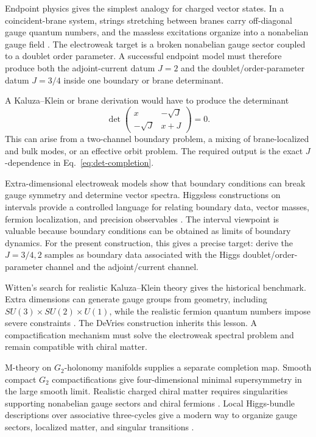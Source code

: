 Endpoint physics gives the simplest analogy for charged vector states.  In a coincident-brane system, strings stretching between branes carry off-diagonal gauge quantum numbers, and the massless excitations organize into a nonabelian gauge field \cite{TongString}.  The electroweak target is a broken nonabelian gauge sector coupled to a doublet order parameter.  A successful endpoint model must therefore produce both the adjoint-current datum \(J=2\) and the doublet/order-parameter datum \(J=3/4\) inside one boundary or brane determinant.

A Kaluza--Klein or brane derivation would have to produce the determinant
\begin{equation}
  \det\begin{pmatrix}
    x & -\sqrt{J}\\
    -\sqrt{J} & x+J
  \end{pmatrix}=0.
  \label{eq:det-completion}
\end{equation}
This can arise from a two-channel boundary problem, a mixing of brane-localized and bulk modes, or an effective orbit problem.  The required output is the exact \(J\)-dependence in Eq.~\eqref{eq:det-completion}.

Extra-dimensional electroweak models show that boundary conditions can break gauge symmetry and determine vector spectra.  Higgsless constructions on intervals provide a controlled language for relating boundary data, vector masses, fermion localization, and precision observables \cite{CsakiHubiszMeade2005}.  The interval viewpoint is valuable because boundary conditions can be obtained as limits of boundary dynamics.  For the present construction, this gives a precise target: derive the \(J=3/4,2\) samples as boundary data associated with the Higgs doublet/order-parameter channel and the adjoint/current channel.

Witten's search for realistic Kaluza--Klein theory gives the historical benchmark.  Extra dimensions can generate gauge groups from geometry, including \(SU(3)\times SU(2)\times U(1)\), while the realistic fermion quantum numbers impose severe constraints \cite{WittenKK1981}.  The DeVries construction inherits this lesson.  A compactification mechanism must solve the electroweak spectral problem and remain compatible with chiral matter.

M-theory on \(G_2\)-holonomy manifolds supplies a separate completion map.  Smooth compact \(G_2\) compactifications give four-dimensional minimal supersymmetry in the large smooth limit.  Realistic charged chiral matter requires singularities supporting nonabelian gauge sectors and chiral fermions \cite{WittenG2Anomaly2001,AcharyaWitten2001,AcharyaGukov2004}.  Local Higgs-bundle descriptions over associative three-cycles give a modern way to organize gauge sectors, localized matter, and singular transitions \cite{BraunEtAl2019}.

